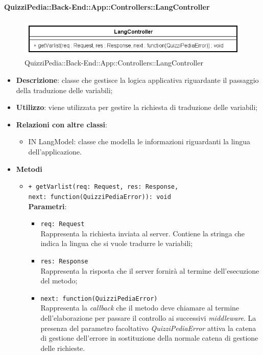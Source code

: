 \paragraph{QuizziPedia::Back-End::App::Controllers::LangController}
\label{QuizziPedia::Back-End::App::Controllers::UserController}
\begin{figure}[ht]
	\centering
	\includegraphics[scale=0.8]{UML/Classi/Back-End/QuizziPedia_Back-End_App_Controllers_langController.png}
	\caption{QuizziPedia::Back-End::App::Controllers::LangController}
\end{figure}
\FloatBarrier
\begin{itemize}
	\item 
	\textbf{Descrizione}:
	classe che gestisce la logica applicativa riguardante il passaggio della traduzione delle variabili;
	\item \textbf{Utilizzo}:
	viene utilizzata per gestire la richiesta di traduzione delle variabili;
	\item \textbf{Relazioni con altre classi}:
	\begin{itemize}
		\item IN LangModel: classe che modella le informazioni riguardanti la lingua dell'applicazione.
	\end{itemize}
	\item \textbf{Metodi}
		\begin{itemize}
			\item \texttt{+ getVarlist(req: Request, res: Response,\\ next: function(QuizziPediaError)): void} \\
			\textbf{Parametri}:
				\begin{itemize}
					\item \texttt{req: Request} \\
					Rappresenta la richiesta inviata al server. Contiene la stringa che indica la lingua che si vuole tradurre le variabili;
					\item \texttt{res: Response} \\
					Rappresenta la risposta che il server fornirà al termine  dell'esecuzione del metodo;
					\item \texttt{next: function(QuizziPediaError)} \\
					Rappresenta la \textit{callback} che il metodo deve chiamare al termine dell'elaborazione per passare il controllo ai successivi \textit{middleware}. La presenza del parametro facoltativo \textit{QuizziPediaError} attiva la catena di gestione dell'errore in sostituzione della normale catena di gestione delle richieste.
				\end{itemize}
		\end{itemize}
\end{itemize}
